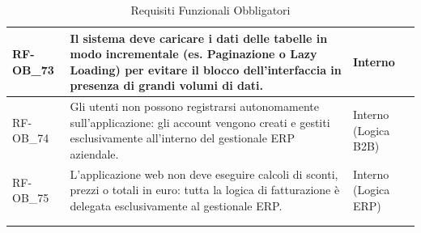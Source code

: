 \begin{longtable}{|>{\raggedright}p{}|>{\raggedright\arraybackslash}p{}|>{\raggedright\arraybackslash}p{}|}
    \hline
    RF-OB\_73 \hypertarget{rf-ob_73} & Il sistema deve caricare i dati delle tabelle in modo incrementale (es. Paginazione o Lazy Loading) per evitare il blocco dell'interfaccia in presenza di grandi volumi di dati. & Interno \\
    \hline
    RF-OB\_74 \hypertarget{rf-ob_74} & Gli utenti non possono registrarsi autonomamente sull'applicazione: gli account vengono creati e gestiti esclusivamente all'interno del gestionale ERP aziendale. & Interno (Logica B2B) \\
    \hline
    RF-OB\_75 \hypertarget{rf-ob_75} & L'applicazione web non deve eseguire calcoli di sconti, prezzi o totali in euro: tutta la logica di fatturazione è delegata esclusivamente al gestionale ERP. & Interno (Logica ERP) \\
    \hline
    \multicolumn{3}{c}{} \\
    \caption{Requisiti Funzionali Obbligatori}\hypertarget{tab:funzionali_obbligatori}\\
\end{longtable}

    
